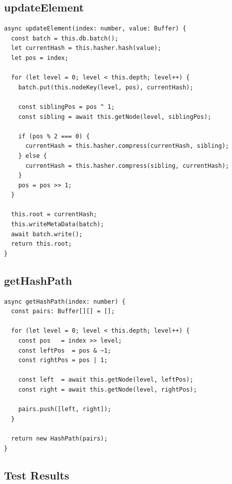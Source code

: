 \documentclass[12pt,a4paper]{article}
\begin{document}
\subsection{updateElement}

\begin{lstlisting}[style=tscode, caption={TypeScript updateElement — path traversal with batched writes}]
async updateElement(index: number, value: Buffer) {
  const batch = this.db.batch();
  let currentHash = this.hasher.hash(value);
  let pos = index;

  for (let level = 0; level < this.depth; level++) {
    batch.put(this.nodeKey(level, pos), currentHash);

    const siblingPos = pos ^ 1;
    const sibling = await this.getNode(level, siblingPos);

    if (pos % 2 === 0) {
      currentHash = this.hasher.compress(currentHash, sibling);
    } else {
      currentHash = this.hasher.compress(sibling, currentHash);
    }
    pos = pos >> 1;
  }

  this.root = currentHash;
  this.writeMetaData(batch);
  await batch.write();
  return this.root;
}
\end{lstlisting}

\subsection{getHashPath}

\begin{lstlisting}[style=tscode, caption={TypeScript getHashPath — returning sibling pairs}]
async getHashPath(index: number) {
  const pairs: Buffer[][] = [];

  for (let level = 0; level < this.depth; level++) {
    const pos   = index >> level;
    const leftPos  = pos & ~1;
    const rightPos = pos | 1;

    const left  = await this.getNode(level, leftPos);
    const right = await this.getNode(level, rightPos);

    pairs.push([left, right]);
  }

  return new HashPath(pairs);
}
\end{lstlisting}

\subsection{Test Results}
\end{document}
